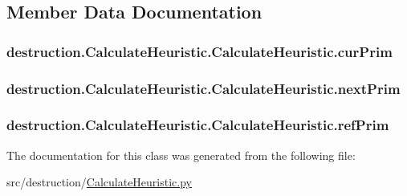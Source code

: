 \subsection{Member Data Documentation}
\hypertarget{classdestruction_1_1_calculate_heuristic_1_1_calculate_heuristic_a5433d054c262cf5acf995d6e4ec9e3f6}{
\subsubsection[{cur\-Prim}]{\setlength{\rightskip}{0pt plus 5cm}destruction.\-Calculate\-Heuristic.\-Calculate\-Heuristic.\-cur\-Prim}}\label{classdestruction_1_1_calculate_heuristic_1_1_calculate_heuristic_a5433d054c262cf5acf995d6e4ec9e3f6}
\hypertarget{classdestruction_1_1_calculate_heuristic_1_1_calculate_heuristic_af8cbd1b9702423eb2eb63e67a6069d1a}{
\subsubsection[{next\-Prim}]{\setlength{\rightskip}{0pt plus 5cm}destruction.\-Calculate\-Heuristic.\-Calculate\-Heuristic.\-next\-Prim}}\label{classdestruction_1_1_calculate_heuristic_1_1_calculate_heuristic_af8cbd1b9702423eb2eb63e67a6069d1a}
\hypertarget{classdestruction_1_1_calculate_heuristic_1_1_calculate_heuristic_abf84d894d5f7bc0b6b992f1643e3cc06}{
\subsubsection[{ref\-Prim}]{\setlength{\rightskip}{0pt plus 5cm}destruction.\-Calculate\-Heuristic.\-Calculate\-Heuristic.\-ref\-Prim}}\label{classdestruction_1_1_calculate_heuristic_1_1_calculate_heuristic_abf84d894d5f7bc0b6b992f1643e3cc06}


The documentation for this class was generated from the following file\-:\begin{DoxyCompactItemize}
\item 
src/destruction/\hyperlink{_calculate_heuristic_8py}{Calculate\-Heuristic.\-py}\end{DoxyCompactItemize}
